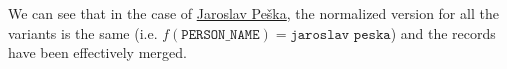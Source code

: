 We can see that in the case of \hyperref[fig:jaroslav-peska]{Jaroslav Peška}, 
the normalized version for all the variants is the same (i.e. $f(\texttt{PERSON\_NAME}) = \texttt{jaroslav peska}$)
and the records have been effectively merged.










